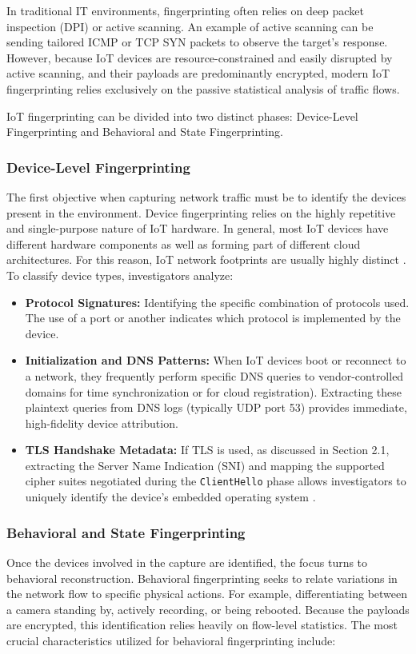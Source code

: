 In traditional IT environments, fingerprinting often relies on deep packet inspection (DPI) or active scanning. An example of active scanning can be sending tailored ICMP or TCP SYN packets to observe the target's response. However, because IoT devices are resource-constrained and easily disrupted by active scanning, and their payloads are predominantly encrypted, modern IoT fingerprinting relies exclusively on the passive statistical analysis of traffic flows.

IoT fingerprinting can be divided into two distinct phases: Device-Level Fingerprinting and Behavioral and State Fingerprinting.

\subsubsection{Device-Level Fingerprinting}
The first objective when capturing network traffic must be to identify the devices present in the environment. Device fingerprinting relies on the highly repetitive and single-purpose nature of IoT hardware. In general, most IoT devices have different hardware components as well as forming part of different cloud architectures. For this reason, IoT network footprints are usually highly distinct \cite{Sivanathan2019}. To classify device types, investigators analyze:

\begin{itemize}
	\item \textbf{Protocol Signatures:} Identifying the specific combination of protocols used. The use of a port or another indicates which protocol is implemented by the device. 
	\item \textbf{Initialization and DNS Patterns:} When IoT devices boot or reconnect to a network, they frequently perform specific DNS queries to vendor-controlled domains for time synchronization or for cloud registration). Extracting these plaintext queries from DNS logs (typically UDP port 53) provides immediate, high-fidelity device attribution.
	\item \textbf{TLS Handshake Metadata:} If TLS is used, as discussed in Section 2.1, extracting the Server Name Indication (SNI) and mapping the supported cipher suites negotiated during the \texttt{ClientHello} phase allows investigators to uniquely identify the device's embedded operating system \cite{Miettinen2017}.
\end{itemize}

\subsubsection{Behavioral and State Fingerprinting}
Once the devices involved in the capture are identified, the focus turns to behavioral reconstruction. Behavioral fingerprinting seeks to relate variations in the network flow to specific physical actions. For example, differentiating between a camera standing by, actively recording, or being rebooted. Because the payloads are encrypted, this identification relies heavily on flow-level statistics. The most crucial characteristics utilized for behavioral fingerprinting include:

